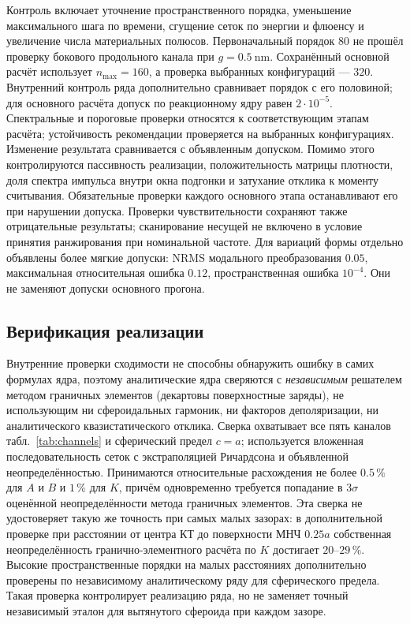 Контроль включает уточнение пространственного порядка, уменьшение
максимального шага по времени, сгущение сеток по энергии и флюенсу
и увеличение числа материальных полюсов. Первоначальный порядок $80$
не прошёл проверку бокового продольного канала при
$g=\SI{0.5}{\nano\meter}$. Сохранённый основной расчёт использует
$n_{\max}=160$, а проверка выбранных конфигураций --- $320$.
Внутренний контроль ряда дополнительно сравнивает порядок с его половиной;
для основного расчёта допуск по реакционному ядру равен $2\cdot10^{-5}$.
Спектральные и пороговые проверки относятся
к соответствующим этапам расчёта; устойчивость рекомендации проверяется
на выбранных конфигурациях. Изменение результата сравнивается
с объявленным допуском. Помимо
этого контролируются пассивность реализации, положительность матрицы
плотности, доля спектра импульса внутри окна подгонки и затухание отклика к
моменту считывания. Обязательные проверки каждого основного этапа
останавливают его при нарушении допуска. Проверки чувствительности
сохраняют также отрицательные результаты; сканирование несущей
не включено в условие принятия ранжирования при номинальной частоте.
Для вариаций формы отдельно объявлены более мягкие допуски:
NRMS модального преобразования $0.05$, максимальная относительная
ошибка $0.12$, пространственная ошибка $10^{-4}$.
Они не заменяют допуски основного прогона.

\subsection{Верификация реализации}
\label{sec:verification}

Внутренние проверки сходимости не способны обнаружить ошибку в самих формулах
ядра, поэтому аналитические ядра сверяются с \emph{независимым} решателем
методом граничных элементов (декартовы поверхностные заряды), не использующим
ни сфероидальных гармоник, ни факторов деполяризации, ни аналитического
квазистатического отклика. Сверка охватывает все пять каналов
табл.~\ref{tab:channels} и сферический предел $c=a$; используется вложенная
последовательность сеток с экстраполяцией Ричардсона и объявленной
неопределённостью. Принимаются относительные расхождения не более $0.5\,\%$ для
$A$ и $B$ и $1\,\%$ для $K$, причём одновременно требуется попадание в
$3\sigma$ оценённой неопределённости метода граничных элементов.
Эта сверка не удостоверяет такую же точность при самых малых зазорах:
в дополнительной проверке при расстоянии от центра КТ до поверхности
МНЧ $0.25a$ собственная неопределённость гранично-элементного расчёта
по $K$ достигает $20$--$29\,\%$. Высокие пространственные порядки
на малых расстояниях дополнительно проверены по независимому
аналитическому ряду для сферического предела. Такая проверка
контролирует реализацию ряда, но не заменяет точный независимый
эталон для вытянутого сфероида при каждом зазоре.

